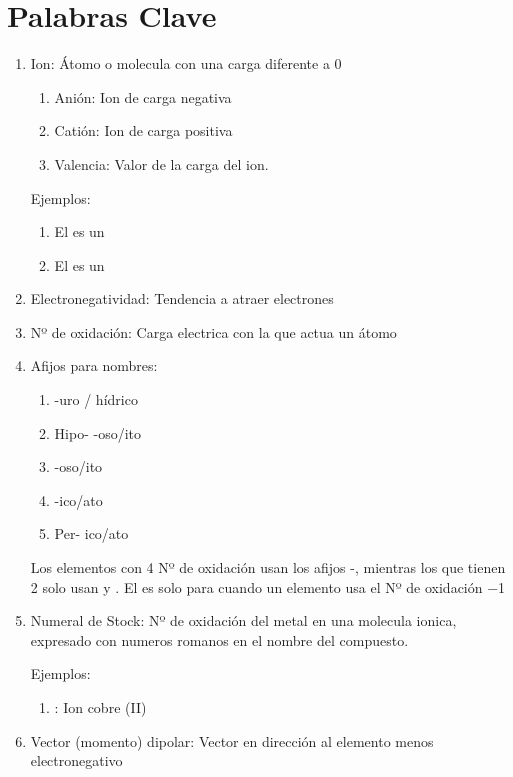 \documentclass[../Teoría.root.tex]{subfiles}
\begin{document}
\section{Palabras Clave}
\begin{enumerate}
    \item Ion: Átomo o molecula con una carga diferente a 0
    \begin{enumerate}
        \item Anión: Ion de carga negativa
        \item Catión: Ion de carga positiva
        \item Valencia: Valor de la carga del ion.
    \end{enumerate}
    Ejemplos: 
    \begin{enumerate}
        \item El  es un 
        \item El  es un 
    \end{enumerate}

    \item Electronegatividad: Tendencia a atraer electrones
    
    \item Nº de oxidación: Carga electrica con la que actua un átomo
    
    \item Afijos para nombres:
    \begin{enumerate}
        \item -uro / hídrico
        \item Hipo- -oso/ito
        \item -oso/ito
        \item -ico/ato
        \item Per- ico/ato
    \end{enumerate}
    Los elementos con \num{4} Nº de oxidación usan los afijos -, mientras los que tienen \num{2} solo usan  y . El  es solo para cuando un elemento usa el Nº de oxidación \num{-1} %

    \item Numeral de Stock: Nº de oxidación del metal en una molecula ionica, expresado con numeros romanos en el nombre del compuesto.
    
    Ejemplos:
    \begin{enumerate}
        \item {}: Ion cobre (II)
    \end{enumerate}

    \item Vector (momento) dipolar: Vector en dirección al elemento menos electronegativo
    
\end{enumerate}
\end{document}

